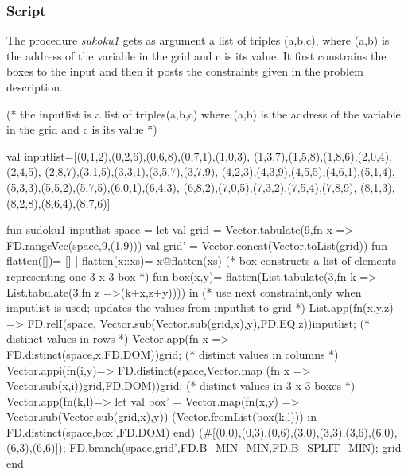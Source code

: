 \documentclass[a4paper]{scrartcl}
\begin{document}
\subsubsection{Script}
The procedure {\it sukoku1} gets as argument a list of
triples (a,b,c), where (a,b) is the address of the variable 
in the grid and c is its value. It first constrains the
boxes to the input and then it posts the constraints given in
the problem description. 
\begin{myverbatim}
(* the inputlist is a list of triples(a,b,c) where
   (a,b) is the address of the variable in the grid
   and c is its value  *)

val inputlist=[(0,1,2),(0,2,6),(0,6,8),(0,7,1),(1,0,3),
               (1,3,7),(1,5,8),(1,8,6),(2,0,4),(2,4,5),
               (2,8,7),(3,1,5),(3,3,1),(3,5,7),(3,7,9),
               (4,2,3),(4,3,9),(4,5,5),(4,6,1),(5,1,4),
               (5,3,3),(5,5,2),(5,7,5),(6,0,1),(6,4,3),
               (6,8,2),(7,0,5),(7,3,2),(7,5,4),(7,8,9),
               (8,1,3),(8,2,8),(8,6,4),(8,7,6)]

fun sudoku1 inputlist space =
    let
        val grid = Vector.tabulate(9,fn x => 
                           FD.rangeVec(space,9,(1,9)))
        val grid' = Vector.concat(Vector.toList(grid))
        fun flatten([])= []
              | flatten(x::xs)= x@flatten(xs)
        (* box constructs a list of elements representing
           one 3 x 3 box *)
        fun box(x,y)= flatten(List.tabulate(3,fn k => 
                   List.tabulate(3,fn z =>(k+x,z+y))))
    in 
        (* use next constraint,only when imputlist is used;
           updates the values from inputlist to grid *)
        List.app(fn(x,y,z) => FD.relI(space,
            Vector.sub(Vector.sub(grid,x),y),FD.EQ,z))inputlist;
        (* distinct values in rows *)
        Vector.app(fn x => FD.distinct(space,x,FD.DOM))grid;
        (* distinct values in columns *)
        Vector.appi(fn(i,y)=> FD.distinct(space,Vector.map
                     (fn x => Vector.sub(x,i))grid,FD.DOM))grid;
        (* distinct values in 3 x 3 boxes *)
        Vector.app(fn(k,l)=> 
          let
             val box' = Vector.map(fn(x,y) => 
                              Vector.sub(Vector.sub(grid,x),y))
                             (Vector.fromList(box(k,l)))
          in
             FD.distinct(space,box',FD.DOM)
          end)
         (#[(0,0),(0,3),(0,6),(3,0),(3,3),(3,6),(6,0),(6,3),(6,6)]);
        FD.branch(space,grid',FD.B_MIN_MIN,FD.B_SPLIT_MIN);
        grid
    end
\end{myverbatim}
\end{document}

